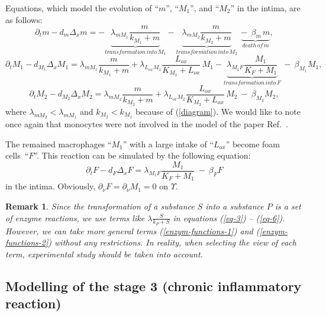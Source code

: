 \documentclass[reqno]{amsart}            %
\newtheorem{remark}{Remark}[section]
\numberwithin{equation}{section}
\begin{document}
\medskip


Equations, which model the evolution of ``$m$'',  ``$M_1$'', and ``$M_2$''  in the intima, are as follows:
\begin{equation}\label{eq-3}
\partial_t m - d_m \Delta_x m=  - \underbrace{\lambda_{m M_1} \frac{m}{k_{M_1} + m}}_{transformation \, into \, M_1}
- \underbrace{\lambda_{mM_2} \frac{m}{k_{M_2} + m}}_{transformation \, into \, M_2}
\ \ \underbrace{- \ \ \beta_m\, m}_{death \,of\, m},
\end{equation}
\begin{equation}\label{eq-4}
\partial_t M_1 - d_{M_1} \Delta_x M_1 =  \lambda_{m M_1} \frac{m}{k_{M_1} + m} + \lambda_{L_{ox}M_1} \frac{L_{ox}}{K_{M_1} + L_{ox}}\, M_1
 - \underbrace{\lambda_{M_1 F} \frac{M_1}{K_F + M_1}}_{transformation \, into \, F}\ - \ \beta_{M_1} M_1,
\end{equation}
\begin{equation}\label{eq-5}
\partial_t M_2 - d_{M_2} \Delta_x M_2 =  \lambda_{mM_2} \frac{m}{k_{M_2} + m} + \lambda_{L_{ox}M_2} \frac{L_{ox}}{K_{M_2} + L_{ox}}\, M_2 \
 - \ \beta_{M_2} M_2,
\end{equation}
where  $\lambda_{m M_2} < \lambda_{m M_1}$ and $k_{M_2} < k_{M_1}$ because of (\ref{diagram}).
We would like to note once again that monocytes were not involved in the model of  the paper Ref.~\cite{HaoFried-14}.



The remained macrophages ``$M_1$'' with a large intake of ``$L_{ox}$'' become  foam cells~``$F$''.
This reaction can be simulated by the following equation:
\begin{equation}\label{eq-6}
\partial_t F - d_{F} \Delta_x F =  \lambda_{M_1 F} \frac{M_1}{K_F + M_1} \ - \ \beta_F F
\end{equation}
in the intima. Obviously, $\partial_{\nu} F = \partial_{\nu} M_1 = 0$ on $\Upsilon.$

\begin{remark}
Since the transformation of a substance $S$ into a substance $P$ is a set of enzyme reactions, we use terms like $\lambda \frac{S}{k_P + S}$
in equations (\ref{eq-3}) -- (\ref{eq-6}). However, we can take more general terms (\ref{enzym-functions-1}) and (\ref{enzym-functions-2}) without any restrictions. In  reality, when selecting the view of each term, experimental study should be taken into account.
\end{remark}



\subsection{Modelling of the stage 3 (chronic inflammatory reaction)}
\end{document}
